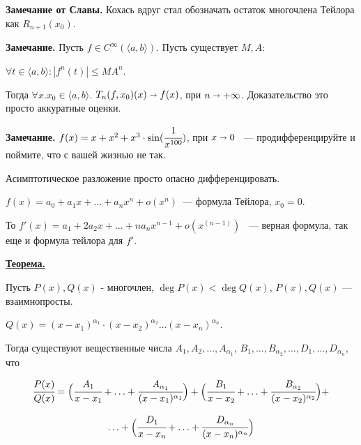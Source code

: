 \documentclass{article}
\newcommand{\thmm}[1]{\underline{\textbf{#1}}}
\begin{document}
\textbf{Замечание от Славы.} Кохась вдруг стал обозначать остаток многочлена Тейлора как $R_{n+1}(x_0)$.

\textbf{Замечание.} Пусть $f\in C^{\infty}(\langle a,b\rangle)$. Пусть существует $ M,A$:

$\forall t \in \langle a,b \rangle: |f^{n}(t)|\leq MA^n$.

Тогда $\forall x.x_0 \in \langle a,b\rangle$. $T_n(f,x_0)(x) \shortrightarrow f(x)$, при $n \shortrightarrow +\infty$. Доказательство это просто аккуратные оценки.

\textbf{Замечание.} $f(x) = x + x^2 + x^3 \cdot \sin(\cfrac{1}{x^{100}})$, при $x\shortrightarrow 0$ ~--- продифференцируйте и поймите, что с вашей жизнью не так.

Асимптотическое разложение просто опасно дифференцировать.

$f(x) = a_0+a_1x +\ldots +a_n x^n + o(x^n)$~--- формула Тейлора, $x_0=0$.

То $f'(x) = a_1+2a_2x + \ldots + n a_n x^{n-1} + o(x^{(n-1)})$ ~--- верная формула, так еще и формула тейлора для $f'$.

\thmm{Теорема.}

Пусть $P(x), Q(x) $ - многочлен, $\deg P(x) < \deg Q(x)$, $P(x),Q(x)$ --- взаимнопросты.

$Q(x) = (x-x_1)^{\alpha_1}\cdot (x-x_2)^{\alpha_2}\ldots(x-x_n)^{\alpha_n}$.

Тогда существуют вещественные числа $A_1, A_2,\ldots, A_{\alpha_1}$, $B_1,\ldots, B_{\alpha_2},\ldots, D_{1},\ldots, D_{\alpha_n}$, что

\[\cfrac{P(x)}{Q(x)}=\Big(\cfrac{A_1}{x-x_1}+ \ldots + \cfrac{A_{\alpha_1}}{(x-x_1)^{\alpha_1}}\Big) +\Big(\cfrac{B_1}{x-x_2}+ \ldots + \cfrac{B_{\alpha_2}}{(x-x_2)^{\alpha_2}}\Big) +\]

\[ \ldots + \Big(\cfrac{D_1}{x-x_n}+ \ldots + \cfrac{D_{\alpha_n}}{(x-x_n)^{\alpha_n}}\Big)\]
\end{document}
